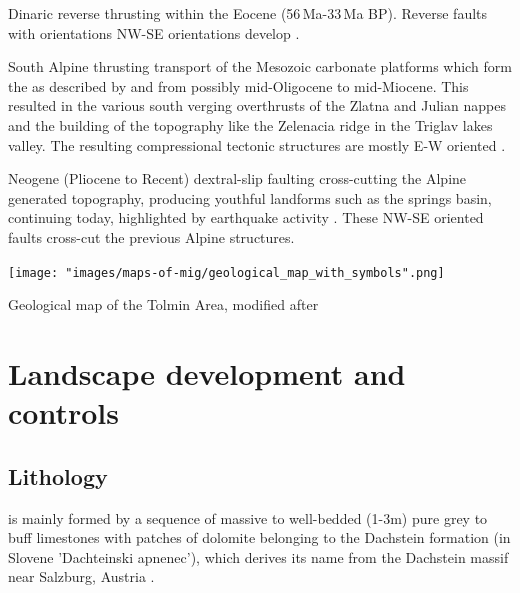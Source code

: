 \begin{citemize}
\item Dinaric reverse thrusting within the Eocene (56\,Ma-33\,Ma BP). Reverse faults with orientations NW-SE orientations develop  \citep{castellarin2000neo}.
\item South Alpine thrusting transport of the Mesozoic carbonate platforms which form the  as described by \citet{placer1998contribution} and \citet{buser1986tolmavc} from possibly mid-Oligocene to mid-Miocene. This resulted in the various south verging overthrusts of the Zlatna and Julian nappes and the building of the topography like the Zelenacia ridge in the Triglav lakes valley. The resulting compressional tectonic structures are mostly E-W oriented \citep{castellarin2000neo}.
\item Neogene (Pliocene to Recent) dextral-slip faulting cross-cutting the Alpine generated topography, producing youthful landforms such as the  springs basin, continuing today, highlighted by earthquake activity \citep{vsmuc2009tectonic,cunningham2006application}. These NW-SE oriented faults cross-cut the previous Alpine structures\citep{grenerczy2005tectonic}.
\end{citemize}

 \begin{map*}[t!]
 \checkoddpage \ifoddpage \forcerectofloat \else \forceversofloat \fi
\centering
  \texttt{[image: "images/maps-of-mig/geological\_map\_with\_symbols".png]}
  
  \caption{Geological map of the Tolmin Area, modified after \citet{buser1986tolmavc}}
  \label{map:mapofgeology}
 \end{map*}

\section{Landscape development and controls}
\subsection{Lithology}
\label{par:lithology}

 is mainly formed by a sequence of massive to well-bedded (1-3m) pure grey to buff limestones with patches of dolomite \citep{buser1986tolmavc} belonging to the Dachstein formation (in Slovene 'Dachteinski apnenec'), which derives its name from the Dachstein massif near Salzburg, Austria \citep{ogorelec1996dachstein}. 



